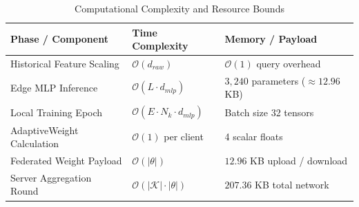 \begin{table}[htbp]
\centering
\caption{Computational Complexity and Resource Bounds}
\label{tab:computational_complexity}
\begin{tabular}{lll}
\toprule
\textbf{Phase / Component} & \textbf{Time Complexity} & \textbf{Memory / Payload} \\
\midrule
Historical Feature Scaling & $\mathcal{O}(d_{raw})$ & $\mathcal{O}(1)$ query overhead \\
Edge MLP Inference & $\mathcal{O}(L \cdot d_{mlp})$ & $3,240$ parameters ($\approx 12.96$ KB) \\
Local Training Epoch & $\mathcal{O}(E \cdot N_k \cdot d_{mlp})$ & Batch size 32 tensors \\
AdaptiveWeight Calculation & $\mathcal{O}(1)$ per client & 4 scalar floats \\
Federated Weight Payload & $\mathcal{O}(|\theta|)$ & $12.96$ KB upload / download \\
Server Aggregation Round & $\mathcal{O}(|\mathcal{K}| \cdot |\theta|)$ & $207.36$ KB total network \\
\bottomrule
\end{tabular}
\end{table}
